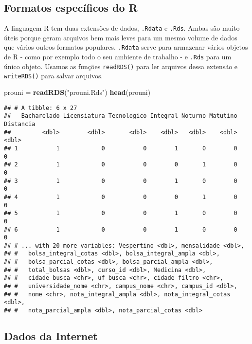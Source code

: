 \documentclass[]{article}
\newenvironment{Shaded}{\begin{snugshade}}{\end{snugshade}}
\newcommand{\KeywordTok}[1]{\textcolor[rgb]{0.13,0.29,0.53}{\textbf{#1}}}
\newcommand{\StringTok}[1]{\textcolor[rgb]{0.31,0.60,0.02}{#1}}
\newcommand{\NormalTok}[1]{#1}
\begin{document}
\subsection{Formatos específicos do R}\label{formatos-especificos-do-r}

A linguagem R tem duas extensões de dados, \texttt{.Rdata} e
\texttt{.Rds}. Ambas são muito úteis porque geram arquivos bem mais
leves para um mesmo volume de dados que vários outros formatos
populares. \texttt{.Rdata} serve para armazenar vários objetos de R -
como por exemplo todo o seu ambiente de trabalho - e \texttt{.Rds} para
um único objeto. Usamos as funções \texttt{readRDS()} para ler arquivos
dessa extensão e \texttt{writeRDS()} para salvar arquivos.

\begin{Shaded}
\begin{Highlighting}[]
\NormalTok{prouni =}\StringTok{ }\KeywordTok{readRDS}\NormalTok{(}\StringTok{"prouni.Rds"}\NormalTok{)}
\KeywordTok{head}\NormalTok{(prouni)}
\end{Highlighting}
\end{Shaded}

\begin{verbatim}
## # A tibble: 6 x 27
##   Bacharelado Licensiatura Tecnologico Integral Noturno Matutino Distancia
##         <dbl>        <dbl>       <dbl>    <dbl>   <dbl>    <dbl>     <dbl>
## 1           1            0           0        1       0        0         0
## 2           1            0           0        0       1        0         0
## 3           1            0           0        1       0        0         0
## 4           1            0           0        0       1        0         0
## 5           1            0           0        1       0        0         0
## 6           1            0           0        1       0        0         0
## # ... with 20 more variables: Vespertino <dbl>, mensalidade <dbl>,
## #   bolsa_integral_cotas <dbl>, bolsa_integral_ampla <dbl>,
## #   bolsa_parcial_cotas <dbl>, bolsa_parcial_ampla <dbl>,
## #   total_bolsas <dbl>, curso_id <dbl>, Medicina <dbl>,
## #   cidade_busca <chr>, uf_busca <chr>, cidade_filtro <chr>,
## #   universidade_nome <chr>, campus_nome <chr>, campus_id <dbl>,
## #   nome <chr>, nota_integral_ampla <dbl>, nota_integral_cotas <dbl>,
## #   nota_parcial_ampla <dbl>, nota_parcial_cotas <dbl>
\end{verbatim}

\subsection{Dados da Internet}\label{dados-da-internet}
\end{document}
